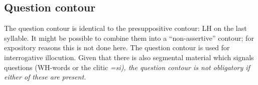% 
% 






% 









\subsection{Question contour}\label{sec:phon:Questioncontour}
The question contour is identical to the presuppositive contour: LH on the last syllable. It might be possible to combine them into a ``non-assertive'' contour; for expository reasons this is not done here. The question contour is used for interrogative illocution. Given that there is also segmental material which signals questions (WH-words or the clitic \em =si\em), the question contour is not obligatory if either of these are present.

